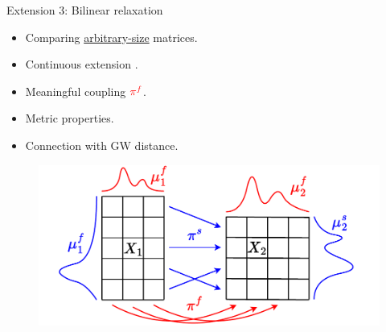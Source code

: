 \documentclass{beamer}
\newcommand{\pif}{{\color{red}{\pi^f}}}
\begin{document}
\begin{frame}{Extension 3: Bilinear relaxation}
\vspace{-0.3cm}
\begin{minipage}[t]{0.6\linewidth}
  \begin{itemize}
    \item Comparing \underline{arbitrary-size} matrices.
    \item Continuous extension \parencite{Chowdhury21b}.
    \item Meaningful {\color{red}{feature}} coupling $\pif$.
    \item Metric properties.
    \item Connection with GW distance.
  \end{itemize}
  \end{minipage}%
  \hfill%
  \hspace{-6cm}
  \begin{minipage}[t]{0.6\linewidth}
    \vspace{0.5cm}
  \begin{figure}
    \centering
    \includegraphics[width=1.15\linewidth, keepaspectratio=true]{OT_new/coot_matrix_ot.pdf}
  \end{figure}
  \end{minipage}
\end{frame}
\end{document}
